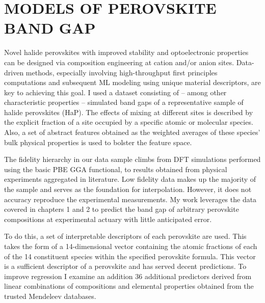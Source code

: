 \chapter{MODELS OF PEROVSKITE BAND GAP}
\label{sec:orgbfd2f81}
Novel halide perovskites with improved stability and optoelectronic properties can be designed via composition engineering at cation and/or anion sites.
Data-driven methods, especially involving high-throughput first principles computations and subsequent ML modeling using unique material descriptors, are key to achieving this goal.
I used a dataset consisting of -- among other characteristic properties -- simulated band gaps of a representative sample of halide perovskites (HaP).
The effects of mixing at different sites is described by the explicit fraction of a site occupied by a specific atomic or molecular species.
Also, a set of abstract features obtained as the weighted averages of these species' bulk physical properties is used to bolster the feature space.

The fidelity hierarchy in our data sample climbs from DFT simulations performed using the basic PBE GGA functional, to results obtained from physical experiments aggregated in literature.
\autocite{almora-2020-devic-perfor,kim-2014-cdses-nanow,swanson-2017-co-sublim}
Low fidelity data makes up the majority of the sample and serves as the foundation for interpolation.
However, it does not accuracy reproduce the experimental measurements.
My work leverages the data covered in chapters 1 and 2 to predict the band gap of arbitrary perovskite compositions at experimental actuary with little anticipated error.

To do this, a set of interpretable descriptors of each perovskite are used.
This takes the form of a 14-dimensional vector containing the atomic fractions of each of the 14 constituent species within the specified perovskite formula.
This vector is a sufficient descriptor of a perovskite and has served decent predictions.
\autocite{mannodi-kanakkithodi-2022-data-driven}
To improve regression I examine an addition 36 additional predictors derived from linear combinations of compositions and elemental properties obtained from the trusted Mendeleev databases.
\autocite{mentel-2014}

